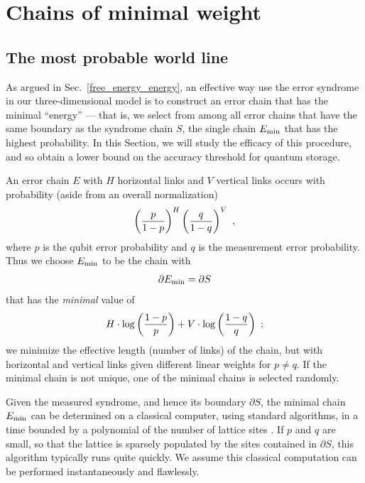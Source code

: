\section{Chains of minimal weight}
\label{sec:chains_minimal}

\subsection{The most probable world line}

As argued in Sec.~\ref{free_energy_energy}, an effective way use the error syndrome in our three-dimensional model is to construct an error chain that has the minimal ``energy'' --- that is, we select from among all error chains that have the same boundary as the syndrome chain $S$, the single chain $E_{\rm min}$ that has the highest probability. In this Section, we will study the efficacy of this procedure, and so obtain a lower bound on the accuracy threshold for quantum storage.

An error chain $E$ with $H$ horizontal links and $V$ vertical links occurs with probability (aside from an overall normalization)
\begin{equation}
\left({p\over 1-p}\right)^{H}\left({q\over 1-q}\right)^{V}~,
\end{equation}
where $p$ is the qubit error probability and $q$ is the measurement error
probability.
Thus we choose $E_{\rm min}$ to be the chain with
\begin{equation}
\partial E_{\rm min}=\partial S
\end{equation}
that has the {\em minimal} value of
\begin{equation}
\label{eq:weight}
H\cdot \log \left({1-p\over p}\right) + V\cdot\log \left({1-q\over q}\right)~;
\end{equation}
we minimize the effective length (number of links) of the chain, but with
horizontal and vertical links given different linear weights for $p\ne q$.  If
the minimal chain is not unique, one of the minimal chains is selected
randomly.

Given the measured syndrome, and hence its boundary $\partial S$, the minimal chain $E_{\rm min}$ can be determined on a
classical computer, using standard algorithms, in a time bounded by a
polynomial of the number of lattice sites \cite{edmonds,barahona_match}.  If $p$ and $q$
are small, so that the lattice is sparsely populated by the sites contained in
$\partial S$, this algorithm typically runs quite
quickly. We assume this classical computation can be performed instantaneously and
flawlessly.

